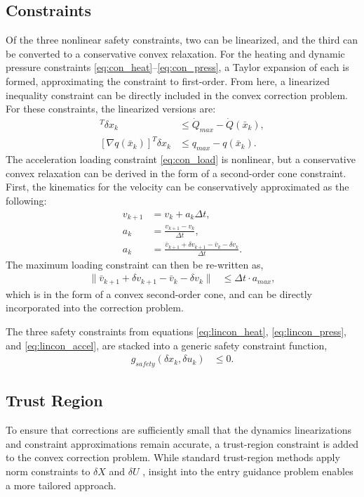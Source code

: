 \subsection{Constraints}
Of the three nonlinear safety constraints, two can be linearized, and the third can be converted to a conservative convex relaxation. For the heating and dynamic pressure constraints \eqref{eq:con_heat}--\eqref{eq:con_press}, a Taylor expansion of each is formed, approximating the constraint to first-order. From here, a linearized inequality constraint can be directly included in the convex correction problem. For these constraints, the linearized versions are:
\begin{align}
 [\nabla \dot{Q}(\bar{x}_k)]^T \delta x_k &\leq \dot{Q}_{max} - \dot{Q}(\bar{x}_k), \label{eq:lincon_heat}\\ 
  [\nabla {q}(\bar{x}_k)]^T \delta {x}_k &\leq {q}_{max} - {q}(\bar{x}_k). \label{eq:lincon_press}
\end{align}
The acceleration loading constraint \eqref{eq:con_load} is nonlinear, but a conservative convex relaxation can be derived in the form of a second-order cone constraint. First, the kinematics for the velocity can be conservatively approximated as the following:
\begin{align}
v_{k+1} &= v_k + a_k \Delta t, \\ 
a_k &= \frac{v_{k+1} - v_k}{\Delta t}, \\
a_k &=  \frac{\bar{v}_{k+1} + \delta v_{k+1} - \bar{v}_k - \delta v_k}{\Delta t}.
\end{align}
The maximum loading constraint can then be re-written as,
\begin{align}
 \|\bar{v}_{k+1} + \delta v_{k+1} - \bar{v}_k - \delta v_k\| &\leq  \Delta t \cdot a_{max}, \label{eq:lincon_accel}
\end{align}
which is in the form of a convex second-order cone, and can be directly incorporated into the correction problem.

The three  safety constraints from equations \eqref{eq:lincon_heat}, \eqref{eq:lincon_press}, and \eqref{eq:lincon_accel}, are stacked into a generic safety constraint function, 
\begin{align}
g_{safety}(\delta x_k, \delta u_k) &\leq 0 . 
\end{align}
\subsection{Trust Region}
To ensure that corrections are sufficiently small that the dynamics linearizations and constraint approximations remain accurate, a trust-region constraint is added to the convex correction problem. While standard trust-region methods apply norm constraints to $\delta  X$ and $\delta U$ \cite{nocedal2006}, insight into the entry guidance problem enables a more tailored approach. 


